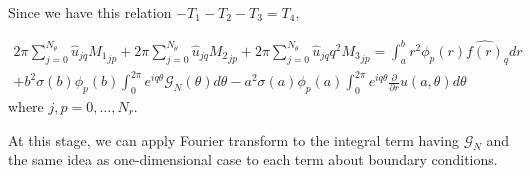 Since we have this relation $- T_1 - T_2 - T_3 = T_4$,

\begin{eqnarray}
 2\pi \sum_{j=0}^{N_\theta} \hat{u}_{jq} {M_1}_{jp}
+ 2\pi \sum_{j=0}^{N_\theta} \hat{u}_{jq} {M_2}_{jp} 
+ 2\pi \sum_{j=0}^{N_\theta} \hat{u}_{jq} q^2 {M_3}_{jp} 
= \int_a^b r^2\phi_p(r) \widehat{f(r)}_q dr \\
+ b^2\sigma(b) \phi_p(b) \int_0^{2\pi}e^{iq\theta} {\mathcal G}_N(\theta) d\theta 
- a^2\sigma(a) \phi_p(a) \int_0^{2\pi}e^{iq\theta} \frac{\partial}{\partial r}u(a,\theta) d\theta
\end{eqnarray}
where $j, p = 0, \ldots, N_r$.

 At this stage, we can apply Fourier transform to the integral term having ${\mathcal G}_N$ and the same idea as 
one-dimensional case to each term about boundary conditions.
